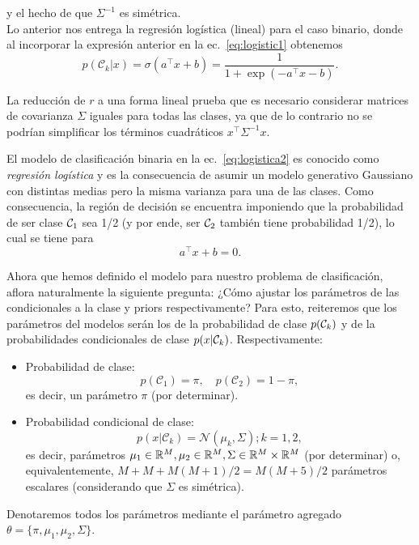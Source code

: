 y el hecho de que $\Sigma^{-1}$ es simétrica.\\

Lo anterior nos entrega la regresión logística (lineal) para el  caso binario, donde al incorporar la expresión anterior en la ec.~\eqref{eq:logistic1} obtenemos
\begin{equation}
	p(\mathcal{C}_k|x) = \sigma(a^\top x+b) = \frac{1}{1 + \exp{\left(-a^\top x-b\right)}}. \label{eq:logistica2}
\end{equation}

\begin{remark}
	La reducción de $r$ a una forma lineal prueba que es necesario considerar matrices de covarianza $\Sigma$ iguales para todas las clases, ya que de lo contrario no se podrían simplificar los términos cuadráticos $x^\top\Sigma^{-1}x$.
\end{remark}

\begin{remark}\label{rem:reg_log} 
El modelo de clasificación binaria en la  ec.~\ref{eq:logistica2} es conocido como \emph{regresión logística} y es la consecuencia de asumir un modelo generativo Gaussiano con distintas medias pero la misma varianza para una de las clases. Como consecuencia, la región de decisión se encuentra imponiendo que la probabilidad de ser clase ${\mathcal C}_1$ sea 1/2 (y por ende, ser ${\mathcal C}_2$ también tiene probabilidad 1/2), lo cual se tiene para 
\begin{equation}
	a^\top x+b = 0.
\end{equation}
\end{remark}

Ahora que hemos definido el modelo para nuestro problema de clasificación, aflora naturalmente la siguiente pregunta: ¿Cómo ajustar los parámetros de las condicionales a la clase y priors respectivamente? Para esto, reiteremos que los parámetros del modelos serán los de la probabilidad de clase $p({\mathcal C}_k)$ y de la probabilidades condicionales de clase $p(x|{\mathcal C}_k)$. Respectivamente: 

\begin{itemize}
	\item Probabilidad de clase:
	\begin{equation}
	 	p(\mathcal{C}_1)=\pi,\quad  p(\mathcal{C}_2)=1-\pi,\label{eq:prob_clase}
	 \end{equation}  es decir,  un parámetro $\pi$ (por determinar).
	\item Probabilidad condicional de clase:
	\begin{equation}
		p(x|\mathcal{C}_k) = \mathcal{N}(\mu_k,  \Sigma); k=1,2,\label{eq:prob_clase_cond}
	\end{equation} 
	es decir, parámetros $ \mu_1\in\mathbb{R}^M,\mu_2\in\mathbb{R}^M,\Sigma\in\mathbb{R}^M\times\mathbb{R}^M$ (por determinar) o, equivalentemente, $M + M + M(M+1)/2=M(M+5)/2$ parámetros escalares (considerando que $\Sigma$ es simétrica). 
\end{itemize}
Denotaremos todos los parámetros mediante el parámetro agregado $\theta =\{\pi,\mu_1,\mu_2,\Sigma \}$.\\

